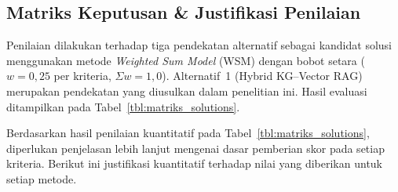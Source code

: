 \subsection{Matriks Keputusan \& Justifikasi Penilaian}
Penilaian dilakukan terhadap tiga pendekatan alternatif sebagai kandidat solusi menggunakan metode \textit{Weighted Sum Model} (WSM) dengan bobot setara ($w = 0{,}25$ per kriteria, $\Sigma w = 1{,}0$). Alternatif~1 (Hybrid KG--Vector RAG) merupakan pendekatan yang diusulkan dalam penelitian ini. Hasil evaluasi ditampilkan pada Tabel~\ref{tbl:matriks_solutions}.



Berdasarkan hasil penilaian kuantitatif pada Tabel~\ref{tbl:matriks_solutions}, diperlukan penjelasan lebih lanjut mengenai dasar pemberian skor pada setiap kriteria. Berikut ini justifikasi kuantitatif terhadap nilai yang diberikan untuk setiap metode.

